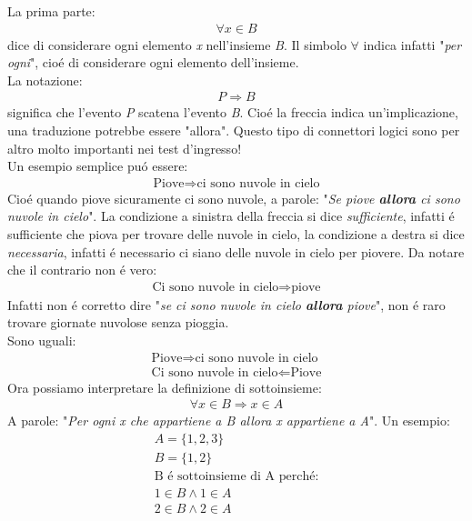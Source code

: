 \documentclass[twoside]{article} %
\begin{document}
	\noindent La prima parte:
	\begin{gather*}
		\forall x\in B
	\end{gather*}
	dice di considerare ogni elemento \textit{x} nell'insieme \textit{B}. Il simbolo $\forall$ indica infatti "\textit{per ogni}", cio\'e di considerare ogni elemento dell'insieme.\\
	La notazione:
	\begin{gather*}
		P\Rightarrow B
	\end{gather*}
	significa che l'evento \textit{P} scatena l'evento \textit{B}. Cio\'e la freccia indica un'implicazione, una traduzione potrebbe essere "allora". Questo tipo di connettori logici sono per altro molto importanti nei test d'ingresso!\\
	\newpage	
	\noindent Un esempio semplice pu\'o essere:
	\begin{gather*}
		\text{Piove}\Rightarrow \text{ci sono nuvole in cielo}
	\end{gather*}
	Cio\'e quando piove sicuramente ci sono nuvole, a parole: "\textit{Se piove \textbf{allora} ci sono nuvole in cielo}". La condizione a sinistra della freccia si dice \textit{sufficiente}, infatti \'e sufficiente che piova per trovare delle nuvole in cielo, la condizione a destra si dice \textit{necessaria}, infatti \'e necessario ci siano delle nuvole in cielo per piovere. Da notare che il contrario non \'e vero:
	\begin{gather*}
		\text{Ci sono nuvole in cielo}\Rightarrow \text{piove}
	\end{gather*}
	Infatti non \'e corretto dire "\textit{se ci sono nuvole in cielo \textbf{allora} piove}",  non \'e raro trovare giornate nuvolose senza pioggia.\\
	Sono uguali:
	\begin{gather*}
		\text{Piove}\Rightarrow \text{ci sono nuvole in cielo}\\
		\text{Ci sono nuvole in cielo} \Leftarrow \text{Piove}
	\end{gather*}
	Ora possiamo interpretare la definizione di sottoinsieme:
	\begin{gather*}
		\forall x\in B\Rightarrow x\in A
	\end{gather*}
	A parole: "\textit{\textit{Per ogni 	\textit{x} che appartiene a \textit{B} allora \textit{x} appartiene a \textit{A}}}". Un esempio:
	\begin{gather*}
		A=\{1,2,3\}\\
		B=\{1,2\}\\
		\text{B \'e sottoinsieme di A perch\'e:}\\
		1\in B \wedge 1\in A\\
		2\in B \wedge 2\in A
	\end{gather*}
\end{document}
